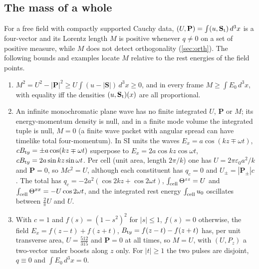 \subsection{The mass of a whole}
\label{sec:energy-whole}

For a free field with compactly supported Cauchy data, $(U,\mathbf P)=\int(u,\mathbf S_{\rm t})\,d^3x$ is a four-vector and its Lorentz length $M$
is positive whenever $q\neq0$ on a set of positive measure, while $M$ does not detect orthogonality (\cref{sec:orth}). The following bounds and
examples locate $M$ relative to the rest energies of the field points.

\begin{proposition}
\label{en:whole}
\begin{enumerate}[label=(\roman*),leftmargin=2.2em]
\item $M^2=U^2-|\mathbf P|^2\ge U\int(u-|\mathbf S|)\,d^3x\ge0$, and in every frame $M\ge\int E_0\,d^3x$, with equality iff the densities
$(u,\mathbf S_{\rm t})(x)$ are all proportional.
\item An infinite monochromatic plane wave has no finite integrated $U$, $\mathbf P$ or $M$; its energy-momentum density is null, and in a
finite mode volume the integrated tuple is null, $M=0$ (a finite wave packet with angular spread can have timelike total four-momentum). In SI units the waves $E_x=a\cos(kz\mp\omega t)$, $cB_{{\rm t}y}=\pm a\cos(kz\mp\omega t)$ superpose to
$E_x=2a\cos kz\cos\omega t$, $cB_{{\rm t}y}=2a\sin kz\sin\omega t$. Per cell (unit area, length $2\pi/k$) one has $U=2\pi\varepsilon_0a^2/k$ and
$\mathbf P=0$, so $Mc^2=U$, although each constituent has $q_c=0$ and $U_\pm=|\mathbf P_\pm|c$. The total has $q_c=-2a^2(\cos2kz+\cos2\omega t)$,
$\int_{\rm cell}\Theta^{zz}=U$ and $\int_{\rm cell}\Theta^{xx}=-U\cos2\omega t$, and the integrated rest energy $\int_{\rm cell}u_0$ oscillates between
$\tfrac2\pi U$ and $U$.
\item With $c=1$ and $f(s)=(1-s^2)^2$ for $|s|\le1$, $f(s)=0$ otherwise, the field $E_x=f(z-t)+f(z+t)$, $B_{{\rm t}y}=f(z-t)-f(z+t)$ has, per unit
transverse area, $U=\tfrac{512}{315}$ and $\mathbf P=0$ at all times, so $M=U$, with $(U,P_z)$ a two-vector under boosts along $z$ only. For $|t|\ge1$
the two pulses are disjoint, $q\equiv0$ and $\int E_0\,d^3x=0$.
\end{enumerate}
\end{proposition}

